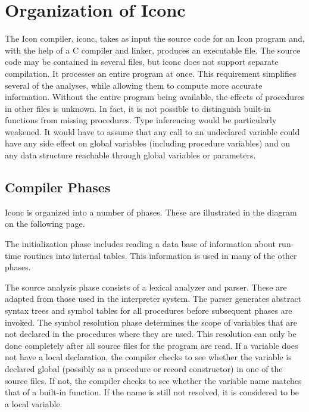 \chapter{Organization of Iconc}

The Icon compiler, iconc, takes as input the source code for an Icon
program and, with the help of a C compiler and linker, produces an
executable file. The source code may be contained in several files,
but iconc does not support separate compilation. It processes an
entire program at once. This requirement simplifies several of the
analyses, while allowing them to compute more accurate
information. Without the entire program being available, the effects
of procedures in other files is unknown. In fact, it is not possible
to distinguish built-in functions from missing procedures. Type
inferencing would be particularly weakened. It would have to assume
that any call to an undeclared variable could have any side effect on
global variables (including procedure variables) and on any data
structure reachable through global variables or parameters.


\section{Compiler Phases}

Iconc is organized into a number of phases. These are illustrated in
the diagram on the following page.

The initialization phase includes reading a data base of information
about run-time routines into internal tables. This information is used
in many of the other phases.

The source analysis phase consists of a lexical analyzer and
parser. These are adapted from those used in the interpreter
system. The parser generates abstract syntax trees and symbol tables
for all procedures before subsequent phases are invoked. The symbol
resolution phase determines the scope of variables that are not
declared in the procedures where they are used. This resolution can
only be done completely after all source files for the program are
read. If a variable does not have a local declaration, the compiler
checks to see whether the variable is declared global (possibly as a
procedure or record constructor) in one of the source files. If not,
the compiler checks to see whether the variable name matches that of a
built-in function. If the name is still not resolved, it is considered
to be a local variable.


